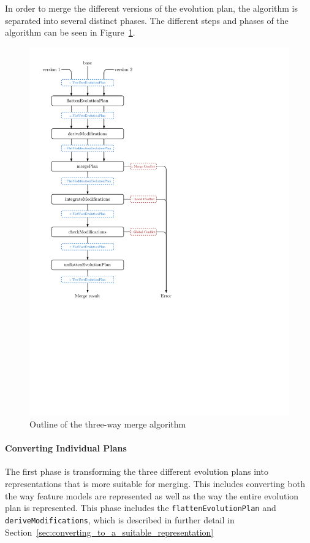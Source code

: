 \documentclass[a4paper,english]{ifimaster}
\begin{document}
In order to merge the different versions of the evolution plan, the algorithm is separated into several distinct phases. The different steps and phases of the algorithm can be seen in Figure~\ref{fig:merge_outline}.

\begin{figure}[htbp]
  \centering
  \includegraphics[width=0.8\linewidth]{merge_outline}
  \caption{Outline of the three-way merge algorithm}%
  \label{fig:merge_outline}
\end{figure}

\paragraph{Converting Individual Plans}%
\label{par:converting_individual_plans}

The first phase is transforming the three different evolution plans into representations that is more suitable for merging. This includes converting both the way feature models are represented as well as the way the entire evolution plan is represented. This phase includes the \texttt{flatten\-Evolution\-Plan} and \texttt{derive\-Modifications}, which is described in further detail in Section~\vref{sec:converting_to_a_suitable_representation}
\end{document}
